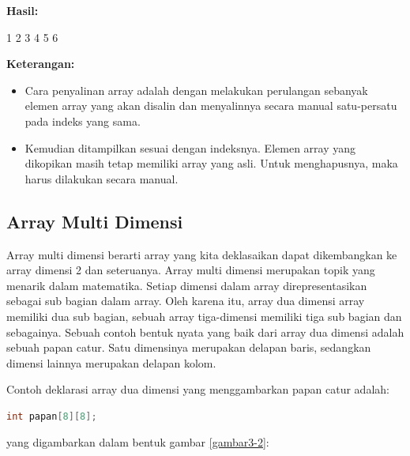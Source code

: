 \textbf{Hasil:}

\begin{lcverbatim}
1
2
3
4
5
6
\end{lcverbatim}

\textbf{Keterangan:}

\begin{itemize}

\item
  Cara penyalinan array adalah dengan melakukan perulangan sebanyak
  elemen array yang akan disalin dan menyalinnya secara manual
  satu-persatu pada indeks yang sama.
\item
  Kemudian ditampilkan sesuai dengan indeksnya. Elemen array yang
  dikopikan masih tetap memiliki array yang asli. Untuk menghapusnya,
  maka harus dilakukan secara manual.
\end{itemize}

\subsection{Array Multi Dimensi}\label{array-multi-dimensi}

Array multi dimensi berarti array yang kita deklasaikan dapat
dikembangkan ke array dimensi 2 dan seteruanya. Array multi dimensi
merupakan topik yang menarik dalam matematika. Setiap dimensi dalam
array direpresentasikan sebagai sub bagian dalam array. Oleh karena itu,
array dua dimensi array memiliki dua sub bagian, sebuah array
tiga-dimensi memiliki tiga sub bagian dan sebagainya. Sebuah contoh
bentuk nyata yang baik dari array dua dimensi adalah sebuah papan catur.
Satu dimensinya merupakan delapan baris, sedangkan dimensi lainnya
merupakan delapan kolom.

Contoh deklarasi array dua dimensi yang menggambarkan papan catur
adalah:

\begin{lstlisting}[language=c++, numbers=none]
int papan[8][8];
\end{lstlisting}

yang digambarkan dalam bentuk gambar \ref{gambar3-2}:

